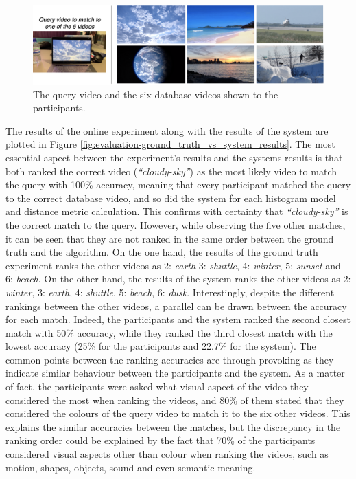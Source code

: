 \begin{figure}[h] 
\centerline{\includegraphics[width=\textwidth]{figures/evaluation/online_experiment_dbvideos.png}}
\caption{\label{fig:evaluation-online_experiment_dbvideos}The query video and the six database videos shown to the participants.}
\end{figure}

The results of the online experiment along with the results of the system are plotted in Figure \ref{fig:evaluation-ground_truth_vs_system_results}. The most essential aspect between the experiment's results and the systems results is that both ranked the correct video (\textit{``cloudy-sky''}) as the most likely video to match the query with 100\% accuracy, meaning that every participant matched the query to the correct database video, and so did the system for each histogram model and distance metric calculation. This confirms with certainty that \textit{``cloudy-sky''} is the correct match to the query. However, while observing the five other matches, it can be seen that they are not ranked in the same order between the ground truth and the algorithm. On the one hand, the results of the ground truth experiment ranks the other videos as 2: \textit{earth} 3: \textit{shuttle}, 4: \textit{winter}, 5: \textit{sunset} and 6: \textit{beach}. On the other hand, the results of the system ranks the other videos as 2: \textit{winter}, 3: \textit{earth}, 4: \textit{shuttle}, 5: \textit{beach}, 6: \textit{dusk}. Interestingly, despite the different rankings between the other videos, a parallel can be drawn between the accuracy for each match. Indeed, the participants and the system ranked the second closest match with 50\% accuracy, while they ranked the third closest match with the lowest accuracy (25\% for the participants and 22.7\% for the system). The common points between the ranking accuracies are through-provoking as they indicate similar behaviour between the participants and the system. As a matter of fact, the participants were asked what visual aspect of the video they considered the most when ranking the videos, and 80\% of them stated that they considered the colours of the query video to match it to the six other videos. This explains the similar accuracies between the matches, but the discrepancy in the ranking order could be explained by the fact that 70\% of the participants considered visual aspects other than colour when ranking the videos, such as motion, shapes, objects, sound and even semantic meaning.

